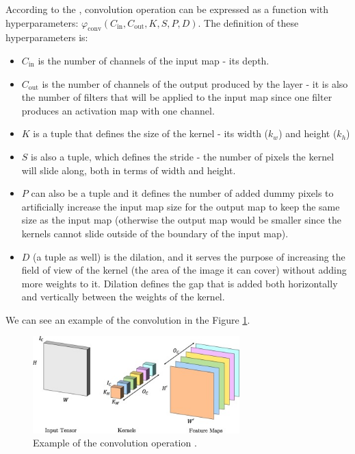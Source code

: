 According to the \cite{Santosh2022-2}, convolution operation can be expressed as a function with hyperparameters: $\varphi_{\text{conv}}(C_{\text{in}}, C_{\text{out}}, K, S, P, D)$. The definition of these hyperparameters is:

\begin{itemize}
    \item $C_{\text{in}}$ is the number of channels of the input map - its depth.
    \item $C_{\text{out}}$ is the number of channels of the output produced by the layer - it is also the number of filters that will be applied to the input map since one filter produces an activation map with one channel.
    \item $K$ is a tuple that defines the size of the kernel - its width ($k_w$) and height ($k_h$)
    \item $S$ is also a tuple, which defines the stride - the number of pixels the kernel will slide along, both in terms of width and height.
    \item $P$ can also be a tuple and it defines the number of added dummy pixels to artificially increase the input map size for the output map to keep the same size as the input map (otherwise the output map would be smaller since the kernels cannot slide outside of the boundary of the input map).
    \item $D$ (a tuple as well) is the dilation, and it serves the purpose of increasing the field of view of the kernel (the area of the image it can cover) without adding more weights to it. Dilation defines the gap that is added both horizontally and vertically between the weights of the kernel.
\end{itemize}

We can see an example of the convolution in the Figure \ref{fig:convolution}.

\begin{figure}[H]
\begin{centering}
\includegraphics[width=8cm]{assets/images/conv.jpg}
\par\end{centering}
\caption{Example of the convolution operation \cite{Santosh2022-2}.}
\label{fig:convolution}
\end{figure}

